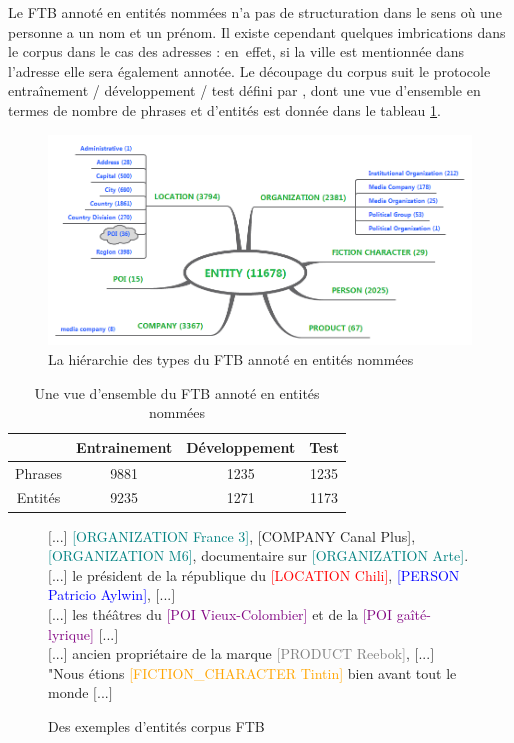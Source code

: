 \documentclass[12pt,a4paper,times,twoside,openright]{report}
\newenvironment{helvetica}{\fontfamily{ppl}\selectfont}{\par}
\begin{document}
Le FTB annoté en entités nommées n'a pas de structuration dans le sens où une personne a un nom et un prénom. Il existe cependant quelques imbrications dans le corpus dans le cas des adresses : en\ effet, si la ville est mentionnée dans l'adresse elle sera également annotée. Le découpage du corpus suit le protocole entraînement / développement / test défini par \citet{crabbe08}, dont une vue d'ensemble en termes de nombre de phrases et d'entités est donnée dans le tableau \ref{tab:ftb6-overview}.

\begin{figure}[ht!]
\centering
\includegraphics[scale=0.4]{images/comparo-FTB6/entities}
\caption{La hiérarchie des types du FTB annoté en entités nommées}
\label{fig:ftb6-hierarchy}
\end{figure}

\begin{table}[ht!]
\centering
\begin{tabular}{|c|c|c|c|}
\cline{2-4}
\multicolumn{1}{c|}{ } & Entrainement & Développement & Test \\
\hline
Phrases    & 9881 & 1235 & 1235 \\
Entités    & 9235 & 1271 & 1173 \\
\hline
\end{tabular}
\caption{Une vue d'ensemble du FTB annoté en entités nommées}
\label{tab:ftb6-overview}
\end{table}

\begin{figure}[ht!]
\begin{helvetica}
\small
$[$...$]$ \textcolor{teal}{[ORGANIZATION France 3]}, \textcolor{green!50!black}{[COMPANY Canal Plus]}, \textcolor{teal}{[ORGANIZATION M6]}, documentaire sur \textcolor{teal}{[ORGANIZATION Arte]}.\\
$[$...$]$ le président de la république du \textcolor{red}{[LOCATION Chili]}, \textcolor{blue}{[PERSON Patricio Aylwin]}, $[$...$]$ \\
$[$...$]$ les théâtres du \textcolor{purple}{[POI Vieux-Colombier]} et de la \textcolor{purple}{[POI gaîté-lyrique]} $[$...$]$ \\
$[$...$]$ ancien propriétaire de la marque \textcolor{gray}{[PRODUCT Reebok]}, $[$...$]$ \\
"Nous étions \textcolor{orange}{[FICTION\_CHARACTER Tintin]} bien avant tout le monde $[$...$]$
\end{helvetica}
\caption{Des exemples d'entités corpus FTB}
\label{fig:FTB-examples}
\end{figure}
\end{document}
